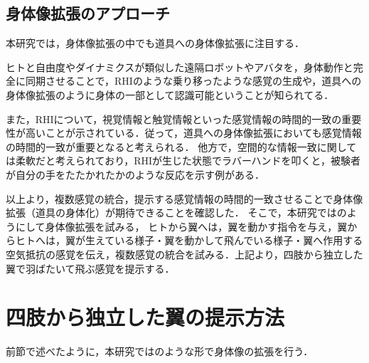 \begin{small}


  \subsection{身体像拡張のアプローチ} 
    本研究では，身体像拡張の中でも道具への身体像拡張に注目する．

    ヒトと自由度やダイナミクスが類似した遠隔ロボットやアバタを，身体動作と完全に同期させることで，RHIのような乗り移ったような感覚の生成や，道具への身体像拡張のように身体の一部として認識可能ということが知られてる．

    また，RHIについて，視覚情報と触覚情報といった感覚情報の時間的一致の重要性が高いことが示されている\cite{ehrsson2007experimental}．従って，道具への身体像拡張においても感覚情報の時間的一致が重要となると考えられる．
    他方で，空間的な情報一致に関しては柔軟だと考えられており，RHIが生じた状態でラバーハンドを叩くと，被験者が自分の手をたたかれたかのような反応を示す例がある\cite{armel2003projecting}．


    以上より，複数感覚の統合，提示する感覚情報の時間的一致させることで身体像拡張（道具の身体化）が期待できることを確認した．
    そこで，本研究ではのようにして身体像拡張を試みる，
    ヒトから翼へは，翼を動かす指令を与え，翼からヒトへは，翼が生えている様子・翼を動かして飛んでいる様子・翼へ作用する空気抵抗の感覚を伝え，複数感覚の統合を試みる．上記より，四肢から独立した翼で羽ばたいて飛ぶ感覚を提示する．


\section{四肢から独立した翼の提示方法}
  前節で述べたように，本研究ではのような形で身体像の拡張を行う．


\end{small}
